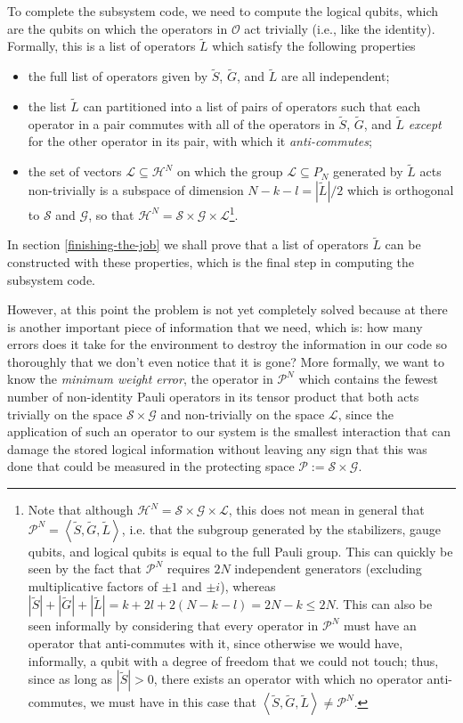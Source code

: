 \documentclass[twocolumn,showpacs,preprintnumbers,amsmath,amssymb,nofootinbib,pra,floatfix]{revtex4}
\begin{document}
To complete the subsystem code, we need to compute the logical qubits, which are the qubits on which the operators in $\mathcal{O}$ act trivially (i.e., like the identity).  Formally, this is a list of operators $\tilde L$ which satisfy the following properties
\begin{itemize}
\item the full list of operators given by $\tilde S$, $\tilde G$, and $\tilde L$ are all independent;
\item the list $\tilde L$ can partitioned into a list of pairs of operators such that each operator in a pair commutes with all of the operators in $\tilde S$, $\tilde G$, and $\tilde L$ \emph{except} for the other operator in its pair, with which it \emph{anti-commutes};
\item the set of vectors $\mathscr{L}\subseteq \mathscr{H}^N$ on which the group $\mathcal{L}\subseteq P_N$ generated by $\tilde L$ acts non-trivially is a subspace of dimension $N-k-l=|\tilde L|/2$ which is orthogonal to $\mathscr{S}$ and $\mathscr{G}$, so that $\mathscr{H}^N=\mathscr{S}\times\mathscr{G}\times\mathscr{L}$\footnote{Note that although $\mathscr{H}^N=\mathscr{S}\times\mathscr{G}\times\mathscr{L}$, this does not mean in general that $\mathcal{P}^N=\left<\tilde S,\tilde G,\tilde L\right>$, i.e. that the subgroup generated by the stabilizers, gauge qubits, and logical qubits is equal to the full Pauli group.  This can quickly be seen by the fact that $\mathcal{P}^N$ requires $2N$ independent generators (excluding multiplicative factors of $\pm 1$ and $\pm i$), whereas $|\tilde S|+|\tilde G|+|\tilde L|=k+2l+2(N-k-l)=2N-k\le 2N$.  This can also be seen informally by considering that every operator in $\mathcal{P}^N$ must have an operator that anti-commutes with it, since otherwise we would have, informally, a qubit with a degree of freedom that we could not touch; thus, since as long as $|\tilde S|>0$, there exists an operator with which no operator anti-commutes, we must have in this case that $\left<\tilde S,\tilde G,\tilde L\right>\ne \mathcal{P}^N$.}.
\end{itemize}
In section \ref{finishing-the-job} we shall prove that a list of operators $\tilde L$ can be constructed with these properties, which is the final step in computing the subsystem code.

However, at this point the problem is not yet completely solved because at there is another important piece of information that we need, which is:  how many errors does it take for the environment to destroy the information in our code so thoroughly that we don't even notice that it is gone?  More formally, we want to know the \emph{minimum weight error}, the operator in $\mathcal{P}^N$ which contains the fewest number of non-identity Pauli operators in its tensor product that both acts trivially on the space $\mathscr{S}\times\mathscr{G}$ and non-trivially on the space $\mathscr{L}$, since the application of such an operator to our system is the smallest interaction that can damage the stored logical information without leaving any sign that this was done that could be measured in the protecting space $\mathscr{P}:=\mathscr{S}\times\mathscr{G}$.
\end{document}
